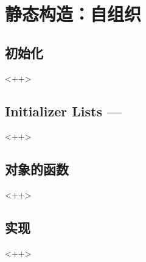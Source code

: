 

\chapter{静态构造：自组织}

\section{初始化}<++>

\section{Initializer Lists ---}<++>

\section{对象的函数}<++>

\section{实现}<++>

